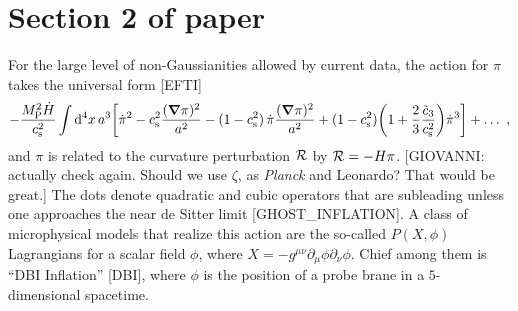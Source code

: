 \documentclass[aps,prd,amsmath,floats,floatfix,superscriptaddress,nofootinbib%
]{revtex4}%
\newcommand{\be}{\begin{equation}}
\newcommand{\ee}{\end{equation}}
\renewcommand\({\left(}
\renewcommand\){\right)}
\renewcommand\[{\left[}
\renewcommand\]{\right]}
\renewcommand{\vec}{\bm}
\def\mpl{M_{\rm P}}
\newcommand{\dif}{\mathrm{d}}
\begin{document}
\section{Section 2 of paper}
\label{sec:sec_2_of_paper} 


\noindent %
For the large level of non-Gaussianities allowed by current data, the action for $\pi$ takes the universal form [EFTI] 
\be
\label{eq:EFTI_action} 
{-\frac{\mpl^2\dot{H}}{c^2_{\rm s}}}\int\dif^4x\,a^3\bigg[\dot{\pi}^2 - c^2_{\rm s}\frac{(\vec{\nabla}\pi)^2}{a^2} 
- ({1-c^2_{\rm s}})\,\dot{\pi}\frac{(\vec{\nabla}\pi)^2}{a^2} + ({1-c^2_{\rm s}})\bigg(1 + \frac{2}{3}\frac{\tilde{c}_3}{c^2_{\rm s}}\bigg)\dot{\pi}^3\bigg]+ \dots\,\,, 
\ee
and $\pi$ is related to the curvature perturbation $\cal R$ by ${\cal R} = {-H\pi}$. 
[GIOVANNI: actually check again. Should we use $\zeta$, as \emph{Planck} and Leonardo? That would be great.] 
The dots denote quadratic and cubic operators that are subleading unless %
one approaches the near de Sitter limit [GHOST\_INFLATION]. 
A class of microphysical models that realize this action are the so-called $P(X,\phi)$ Lagrangians for a scalar field $\phi$, where 
$X = -g^{\mu\nu}\partial_\mu\phi\partial_\nu\phi$. Chief among them is ``DBI Inflation'' [DBI], where $\phi$ is the position of a probe brane in a $5$-dimensional spacetime. 
\end{document}
